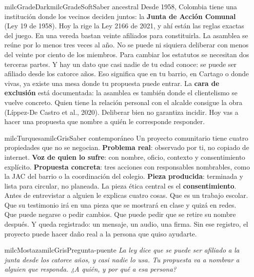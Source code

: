 \documentclass[11pt,letterpaper]{article}
\begin{document}
\begin{softbox}{milcGradeDark}{milcGradeSoft}{Saber ancestral}
Desde 1958, Colombia tiene una institución donde los vecinos deciden juntos: la \textbf{Junta de Acción Comunal} (Ley 19 de 1958). Hoy la rige la Ley 2166 de 2021, y ahí están las reglas exactas del juego. En una vereda bastan veinte afiliados para constituirla. La asamblea se reúne por lo menos tres veces al año. No se puede ni siquiera deliberar con menos del veinte por ciento de los miembros. Para cambiar los estatutos se necesitan dos terceras partes. Y hay un dato que casi nadie de tu edad conoce: se puede ser afiliado desde los catorce años. Eso significa que en tu barrio, en Cartago o donde vivas, ya existe una mesa donde tu propuesta puede entrar. La \textbf{cara de exclusión} está documentada: la asamblea es también donde el clientelismo se vuelve concreto. Quien tiene la relación personal con el alcalde consigue la obra (Líppez-De Castro et al., 2020). Deliberar bien no garantiza incidir. Hoy vas a hacer una propuesta que nombre a quién le corresponde responder.\par{}
\end{softbox}

\begin{softbox}{milcTurquesa}{milcGris}{Saber contemporáneo}
Un proyecto comunitario tiene cuatro propiedades que no se negocian. \textbf{Problema real}: observado por ti, no copiado de internet. \textbf{Voz de quien lo sufre}: con nombre, oficio, contexto y consentimiento explícito. \textbf{Propuesta concreta}: tres acciones con responsables nombrables, como la JAC del barrio o la coordinación del colegio. \textbf{Pieza producida}: terminada y lista para circular, no planeada. La pieza ética central es el \textbf{consentimiento}. Antes de entrevistar a alguien le explicas cuatro cosas. Que es un trabajo escolar. Que su testimonio irá en una pieza que se mostrará en clase y quizá en redes. Que puede negarse o pedir cambios. Que puede pedir que se retire su nombre después. Y queda registrado: un mensaje, un audio, una firma. Sin ese registro, el proyecto puede hacer daño real a la persona que quiso ayudarte.
\end{softbox}

\begin{softbox}{milcMostaza}{milcGris}{Pregunta-puente}
\textit{La ley dice que se puede ser afiliado a la junta desde los catorce años, y casi nadie lo usa. Tu propuesta va a nombrar a alguien que responda. ¿A quién, y por qué a esa persona?}
\end{softbox}
\end{document}
